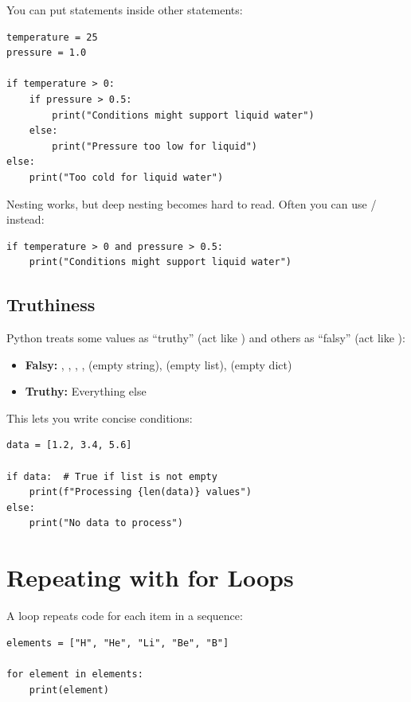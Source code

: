 You can put  statements inside other  statements:

\begin{lstlisting}
temperature = 25
pressure = 1.0

if temperature > 0:
    if pressure > 0.5:
        print("Conditions might support liquid water")
    else:
        print("Pressure too low for liquid")
else:
    print("Too cold for liquid water")
\end{lstlisting}

Nesting works, but deep nesting becomes hard to read. Often you can use / instead:

\begin{lstlisting}
if temperature > 0 and pressure > 0.5:
    print("Conditions might support liquid water")
\end{lstlisting}

\subsection{Truthiness}

Python treats some values as ``truthy'' (act like ) and others as ``falsy'' (act like ):

\begin{itemize}
    \item \textbf{Falsy:} , , , ,  (empty string), \py{[]} (empty list), \py{\{\}} (empty dict)
    \item \textbf{Truthy:} Everything else
\end{itemize}

This lets you write concise conditions:

\begin{lstlisting}
data = [1.2, 3.4, 5.6]

if data:  # True if list is not empty
    print(f"Processing {len(data)} values")
else:
    print("No data to process")
\end{lstlisting}

\section{Repeating with for Loops}
\label{sec:for}

A  loop repeats code for each item in a sequence:

\begin{lstlisting}
elements = ["H", "He", "Li", "Be", "B"]

for element in elements:
    print(element)
\end{lstlisting}

